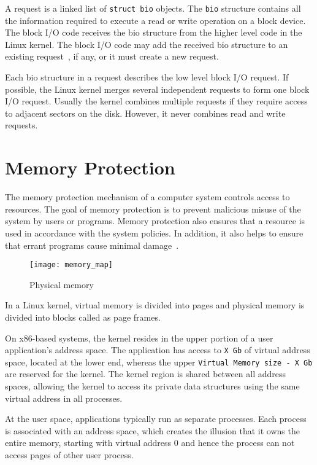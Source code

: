 A request is a linked list of \texttt{struct bio} objects. The \texttt{bio} 
structure contains all the information required to execute a read or write
operation on a block device. The block I/O code receives the bio
structure from the higher level code in the Linux kernel. The
block I/O code may add the received bio structure to an existing
request~\cite{Corbet:2005:LDD:1209083}, if any, or it must create
a new request.

Each bio structure in a request describes the low level block I/O
request. If possible, the Linux kernel merges several independent
requests to form one block I/O request. Usually the kernel combines
multiple requests if they require access to adjacent sectors on
the disk. However, it never combines read and write requests.

\section{Memory Protection}

The memory protection mechanism of a computer system controls
access to resources. The goal of memory protection is to prevent
malicious misuse of the system by users or programs. Memory
protection also ensures that a resource is used in accordance
with the system policies. In addition, it also helps to
ensure that errant programs cause minimal damage~\cite{Galvin,
Graham:1971:PPP:1478873.1478928}.

\begin{figure}[!ht]
\centering
\texttt{[image: memory\_map]}
\caption{Physical memory}
\label{fig:memmap}
\end{figure}

In a Linux kernel, virtual memory is divided into pages and physical memory 
is divided into blocks called as page frames. 

On x86-based systems, the kernel resides in the upper portion of a user 
application's address space.  The application has access to \texttt{X Gb} 
of virtual address space, located at the lower end, whereas
the upper \texttt{Virtual Memory size - X Gb} are reserved 
for the kernel.  The kernel region is shared between all address
spaces, allowing the kernel to access its private data structures
using the same virtual address in all processes.

At the user space, applications typically run as separate processes. Each
process is associated with an address space, which creates the illusion that it owns the
entire memory, starting with virtual address 0 and hence the process can not access pages 
of other user process.


